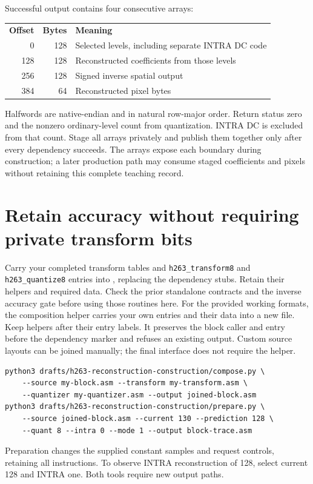 Successful output contains four consecutive arrays:
\begin{center}
  \begin{tabular}{rrl}
    \textbf{Offset} & \textbf{Bytes} & \textbf{Meaning}                                  \\
    0               & 128            & Selected levels, including separate INTRA DC code \\
    128             & 128            & Reconstructed coefficients from those levels      \\
    256             & 128            & Signed inverse spatial output                     \\
    384             & 64             & Reconstructed pixel bytes
  \end{tabular}
\end{center}
Halfwords are native-endian and in natural row-major order. Return status zero
and the nonzero ordinary-level count from quantization. INTRA DC is excluded
from that count. Stage all arrays privately and publish them together only after
every dependency succeeds. The arrays expose each boundary during construction;
a later production path may consume staged coefficients and pixels without
retaining this complete teaching record.

\section{Retain accuracy without requiring private transform bits}
Carry your completed transform tables and \texttt{h263\_transform8} and
\texttt{h263\_quantize8} entries into
, replacing the dependency
stubs. Retain their helpers and required data. Check the prior standalone contracts
and the inverse accuracy gate before using those routines here.
For the provided working formats, the composition helper carries your own entries
and their data into a new file. Keep helpers after their entry labels. It preserves
the block caller and entry before the dependency marker and refuses an existing
output. Custom source layouts can be joined manually; the final interface does
not require the helper.
\begin{verbatim}
python3 drafts/h263-reconstruction-construction/compose.py \
    --source my-block.asm --transform my-transform.asm \
    --quantizer my-quantizer.asm --output joined-block.asm
python3 drafts/h263-reconstruction-construction/prepare.py \
    --source joined-block.asm --current 130 --prediction 128 \
    --quant 8 --intra 0 --mode 1 --output block-trace.asm
\end{verbatim}
Preparation changes the supplied constant samples and request controls, retaining
all instructions. To observe INTRA reconstruction of 128, select current 128
and INTRA one. Both tools require new output paths.

